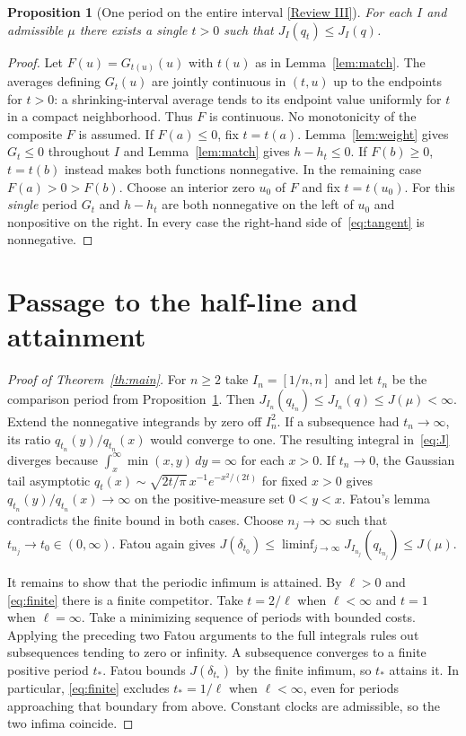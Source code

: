 \documentclass[11pt]{article}
\newcommand{\rmark}[1]{\hyperlink{reviewguide}{\textcolor{reviewblue}{\normalfont\small [Review #1]}}}
\newtheorem{proposition}[theorem]{Proposition}
\begin{document}
\begin{proposition}[One period on the entire interval \rmark{III}]\label{prop:compact}
For each $I$ and admissible $\mu$ there exists a single $t>0$ such that
$J_I(q_t)\le J_I(q)$.
\end{proposition}
\begin{proof}
Let $F(u)=G_{t(u)}(u)$ with $t(u)$ as in Lemma~\ref{lem:match}. The
averages defining $G_t(u)$ are jointly continuous in $(t,u)$ up to the
endpoints for $t>0$: a shrinking-interval average tends to its endpoint
value uniformly for $t$ in a compact neighborhood. Thus $F$ is continuous.
No monotonicity of the composite $F$ is assumed. If $F(a)\le0$, fix $t=t(a)$. Lemma~\ref{lem:weight} gives $G_t\le0$
throughout $I$ and Lemma~\ref{lem:match} gives $h-h_t\le0$. If $F(b)\ge0$,
$t=t(b)$ instead makes both functions nonnegative. In the remaining case
$F(a)>0>F(b)$. Choose an interior zero $u_0$ of $F$ and fix $t=t(u_0)$.
For this \emph{single} period $G_t$ and $h-h_t$ are both nonnegative on
the left of $u_0$ and nonpositive on the right. In every case the
right-hand side of~\eqref{eq:tangent} is nonnegative.
\end{proof}

\section{Passage to the half-line and attainment}\label{sec:attain}
\begin{proof}[Proof of Theorem~\ref{th:main}]
For $n\ge2$ take $I_n=[1/n,n]$ and let $t_n$ be the comparison period
from Proposition~\ref{prop:compact}. Then
$J_{I_n}(q_{t_n})\le J_{I_n}(q)\le J(\mu)<\infty$.
Extend the nonnegative integrands by zero off $I_n^2$.
If a subsequence had $t_n\to\infty$, its ratio $q_{t_n}(y)/q_{t_n}(x)$
would converge to one. The resulting integral in~\eqref{eq:J} diverges
because $\int_x^\infty \min(x,y)\,dy=\infty$ for each $x>0$.
If $t_n\to0$, the Gaussian tail asymptotic
$q_t(x)\sim\sqrt{2t/\pi}\,x^{-1}e^{-x^2/(2t)}$ for fixed $x>0$
gives $q_{t_n}(y)/q_{t_n}(x)\to\infty$ on the positive-measure set $0<y<x$.
Fatou's lemma contradicts the finite bound in both cases.
Choose $n_j\to\infty$ such that $t_{n_j}\to t_0\in(0,\infty)$. Fatou again
gives $J(\delta_{t_0})\le\liminf_{j\to\infty} J_{I_{n_j}}(q_{t_{n_j}})\le J(\mu)$.

It remains to show that the periodic infimum is attained.
By $\ell>0$ and \eqref{eq:finite} there is a finite competitor. Take
$t=2/\ell$ when $\ell<\infty$ and $t=1$ when $\ell=\infty$.
Take a minimizing sequence of periods with bounded costs.
Applying the preceding two Fatou arguments to the full integrals rules
out subsequences tending to zero or infinity. A subsequence converges to
a finite positive period $t_*$. Fatou bounds $J(\delta_{t_*})$ by the
finite infimum, so $t_*$ attains it. In particular, \eqref{eq:finite}
excludes $t_*=1/\ell$ when $\ell<\infty$, even for periods approaching
that boundary from above. Constant clocks are admissible, so the two
infima coincide.
\end{proof}
\end{document}
